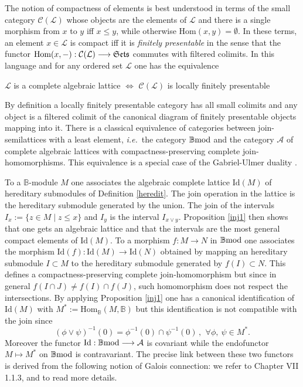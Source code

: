 \documentclass[12pt]{article}
\def\Hom{{\rm Hom}}
\def\id{{\rm id}}
\def\B{{\mathbb B}}
\def\cA{{\mathcal A}}
\def\cC{{\mathcal C}}
\def\cL{{\mathcal L}}
\def\qqq{\,,\,~\forall}
\newcommand{\ie}{{\it i.e.\/}\ }
\def\id{{\mbox{Id}}}
\def\Hom {{\mbox{Hom}}}
\def\bmod{{\rm \B mod}}
\def\Se{\frak{ Sets}}
\begin{document}
The notion of compactness of elements is best understood in terms of the small category  $\cC(\cL)$ whose objects are the elements of $\cL$ and there is a single morphism from $x$ to $y$ iff $x\leq y$, while otherwise $\Hom(x,y)=\emptyset$. In these terms, an element $x\in \cL$ is compact iff it is {\em finitely presentable} in the sense that the functor $\Hom(x,-):\cC(\cL)\longrightarrow \Se$ commutes with filtered colimits. In this language and for any ordered set $\cL$ one has the equivalence

\vspace{.1in}

\centerline{$\cL$ is a complete algebraic lattice $\iff$ $\cC(\cL)$ is locally finitely presentable}
\vspace{.1in}

By definition a locally finitely presentable category has all small colimits and any object is a filtered colimit of the canonical diagram of finitely presentable objects mapping into it.
There is a classical equivalence  of categories between join-semilattices with a least element, \ie the category $\bmod$ and the category $\cA$ of complete algebraic lattices with compactness-preserving complete join-homomorphisms. This equivalence is a special case of the Gabriel-Ulmer duality \cite{GU}. 

To a $\B$-module  $M$ one associates the algebraic complete lattice $\id(M)$ of hereditary submodules of Definition \ref{heredit}. The join operation in the lattice is the hereditary submodule generated by the union. The join of the intervals $I_x:=\{z\in M\mid z\leq x\}$ and $I_y$ is the interval $I_{x\vee y}$.   Proposition   \ref{inj1} then shows that one gets an algebraic lattice and that the intervals  are the most general compact elements of $\id(M)$. To a morphism $f:M\to N$ in $\bmod$ one associates the morphism $\id(f):\id(M)\to \id(N)$ obtained by mapping  an hereditary submodule $I\subset M$ to the hereditary submodule generated by $f(I)\subset N$. This defines a compactness-preserving complete join-homomorphism but since in general $f(I\cap J)\neq f(I)\cap f(J)$, such homomorphism does not respect the intersections. By applying Proposition   \ref{inj1} one has a canonical identification of $\id(M)$ with $M^*:=\Hom_\B(M,\B)$ but this identification is not compatible with the join since 
$$
(\phi\vee \psi)^{-1}(0)=\phi^{-1}(0)\cap \psi^{-1}(0)\qqq \phi, \   \psi \in M^*.
$$
Moreover the functor $\id:\bmod\longrightarrow\cA$ is covariant while the endofunctor $M\mapsto M^*$ on $\bmod$ is contravariant. The precise link between these two functors is derived from the following notion of Galois connection: we refer to \cite{DP} Chapter VII  \cite{gra1} 1.1.3, and \cite{Gierz} to read more details.
\end{document}
